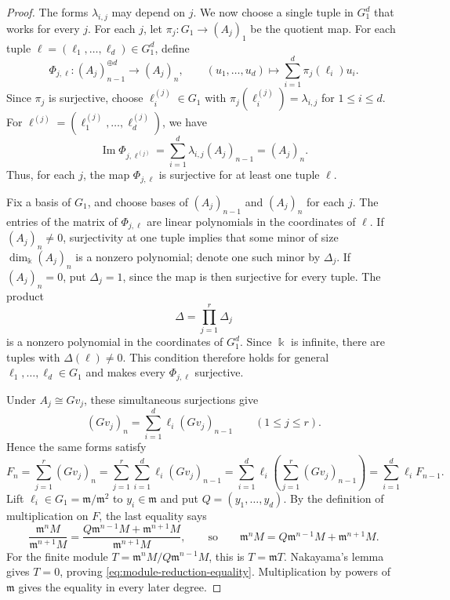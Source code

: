\documentclass[11pt,reqno]{amsart}
\numberwithin{equation}{section}
\theoremstyle{definition}
\newcommand{\m}{\mathfrak m}
\begin{document}
\begin{proof}
The forms $\lambda_{i,j}$ may depend on $j$. We now choose a
single tuple in $G_1^d$ that works for every $j$.
For each $j$, let $\pi_j:G_1\to(A_j)_1$ be the quotient map.
For each tuple $\boldsymbol\ell=(\ell_1,\ldots,\ell_d)\in G_1^d$,
define
\[
 \Phi_{j,\boldsymbol\ell}:(A_j)_{n-1}^{\oplus d}\longrightarrow(A_j)_n,
 \qquad
 (u_1,\ldots,u_d)\longmapsto
 \sum_{i=1}^d\pi_j(\ell_i)u_i.
\]
Since $\pi_j$ is surjective, choose
$\ell_i^{(j)}\in G_1$ with
$\pi_j(\ell_i^{(j)})=\lambda_{i,j}$ for $1\leq i\leq d$.
For $\boldsymbol\ell^{(j)}
=(\ell_1^{(j)},\ldots,\ell_d^{(j)})$, we have
\[
 \operatorname{Im}\Phi_{j,\boldsymbol\ell^{(j)}}
 =\sum_{i=1}^d\lambda_{i,j}(A_j)_{n-1}
 =(A_j)_n.
\]
Thus, for each $j$, the map $\Phi_{j,\boldsymbol\ell}$
is surjective for at least one tuple $\boldsymbol\ell$.

Fix a basis of $G_1$, and choose bases of $(A_j)_{n-1}$ and
$(A_j)_n$ for each $j$.
The entries of the matrix of $\Phi_{j,\boldsymbol\ell}$ are linear
polynomials in the coordinates of $\boldsymbol\ell$.
If $(A_j)_n\ne0$, surjectivity at one tuple implies that some
minor of size $\dim_{\Bbbk}(A_j)_n$ is a nonzero polynomial;
denote one such minor by $\Delta_j$.
If $(A_j)_n=0$, put $\Delta_j=1$, since the map is then
surjective for every tuple.
The product
\[
 \Delta=\prod_{j=1}^r\Delta_j
\]
is a nonzero polynomial in the coordinates of $G_1^d$.
Since $\Bbbk$ is infinite, there are tuples with
$\Delta(\boldsymbol\ell)\ne0$. This condition therefore holds
for general $\ell_1,\ldots,\ell_d\in G_1$ and makes every
$\Phi_{j,\boldsymbol\ell}$ surjective.

Under $A_j\cong Gv_j$, these simultaneous surjections give
\[
 (Gv_j)_n=\sum_{i=1}^d\ell_i(Gv_j)_{n-1}
 \qquad(1\leq j\leq r).
\]
Hence the same forms satisfy
\[
 F_n
 =\sum_{j=1}^r(Gv_j)_n
 =\sum_{j=1}^r\sum_{i=1}^d\ell_i(Gv_j)_{n-1}
 =\sum_{i=1}^d\ell_i\left(\sum_{j=1}^r(Gv_j)_{n-1}\right)
 =\sum_{i=1}^d\ell_iF_{n-1}.
\]
Lift $\ell_i\in G_1=\m/\m^2$ to $y_i\in\m$ and put
$Q=(y_1,\ldots,y_d)$. By the definition of multiplication on $F$,
the last equality says
\[
 \frac{\m^nM}{\m^{n+1}M}
 =\frac{Q\m^{n-1}M+\m^{n+1}M}{\m^{n+1}M},
 \qquad\text{so}\qquad
 \m^nM=Q\m^{n-1}M+\m^{n+1}M.
\]
For the finite module $T=\m^nM/Q\m^{n-1}M$, this is $T=\m T$.
Nakayama's lemma gives $T=0$, proving
\eqref{eq:module-reduction-equality}.
Multiplication by powers of $\m$ gives the equality in every
later degree.
\end{proof}
\end{document}
